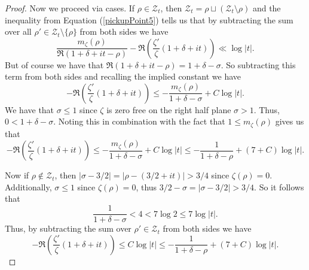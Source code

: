 \begin{proof}
    Now we proceed via cases. If $\rho\in\mathcal{Z}_t$, then
    $\mathcal{Z}_t=\rho\sqcup(\mathcal{Z}_t\setminus\rho)$ and the inequality from Equation
    (\ref{pickupPoint5}) tells us that by subtracting the sum over all
    $\rho'\in\mathcal{Z}_t\setminus\{\rho\}$ from both sides we have
    $$\frac{m_\zeta(\rho)}{\mathfrak{R}(1+\delta+it-\rho)}
      -\mathfrak{R}\left(\frac{\zeta'}{\zeta}(1+\delta+it)\right)\ll\log|t|.$$
    But of course we have that $\mathfrak{R}(1+\delta+it-\rho)=1+\delta-\sigma$. So subtracting this
    term from both sides and recalling the implied constant we have
    $$-\mathfrak{R}\left(\frac{\zeta'}{\zeta}(1+\delta+it)\right)\leq
      -\frac{m_\zeta(\rho)}{1+\delta-\sigma}+C\log|t|.$$
    We have that $\sigma\leq 1$ since $\zeta$ is zero free on the right half plane $\sigma>1$. Thus,
    $0<1+\delta-\sigma$. Noting this in combination with the fact that $1\leq m_\zeta(\rho)$ gives
    us that
    $$-\mathfrak{R}\left(\frac{\zeta'}{\zeta}(1+\delta+it)\right)\leq
      -\frac{m_\zeta(\rho)}{1+\delta-\sigma}+C\log|t|\leq-\frac{1}{1+\delta-\rho}+(7+C)\log|t|.$$

    Now if $\rho\not\in\mathcal{Z}_t$, then $|\sigma-3/2|=|\rho-(3/2+it)|>3/4$ since
    $\zeta(\rho)=0$. Additionally, $\sigma\leq 1$ since $\zeta(\rho)=0$, thus
    $3/2-\sigma=|\sigma-3/2|>3/4$. So it follows that
    $$\frac{1}{1+\delta-\sigma}<4<7\log 2\leq 7\log|t|.$$
    Thus, by subtracting the sum over $\rho'\in\mathcal{Z}_t$ from both sides we have
    $$-\mathfrak{R}\left(\frac{\zeta'}{\zeta}(1+\delta+it)\right)\leq
      C\log|t|\leq-\frac{1}{1+\delta-\rho}+(7+C)\log|t|.$$
\end{proof}
